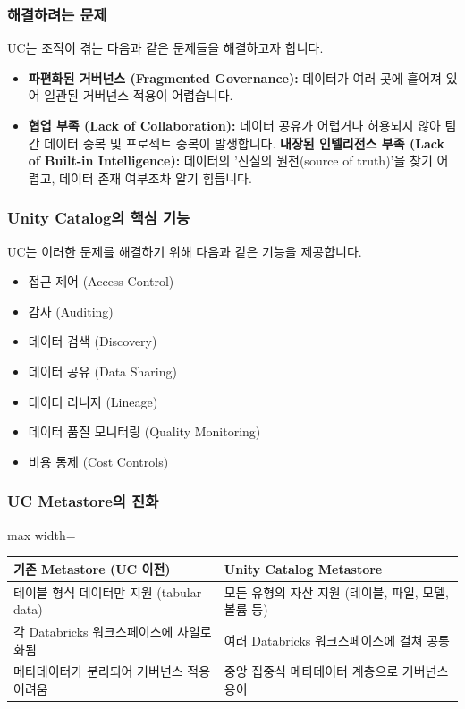 \documentclass[11pt,a4paper]{article}
\theoremstyle{definition}
\begin{document}
\subsubsection*{해결하려는 문제}
UC는 조직이 겪는 다음과 같은 문제들을 해결하고자 합니다.
\begin{itemize}
    \item \textbf{파편화된 거버넌스 (Fragmented Governance):} 데이터가 여러 곳에 흩어져 있어 일관된 거버넌스 적용이 어렵습니다.
    \item \textbf{협업 부족 (Lack of Collaboration):} 데이터 공유가 어렵거나 허용되지 않아 팀 간 데이터 중복 및 프로젝트 중복이 발생합니다.
    \textbf{내장된 인텔리전스 부족 (Lack of Built-in Intelligence):} 데이터의 '진실의 원천(source of truth)'을 찾기 어렵고, 데이터 존재 여부조차 알기 힘듭니다.
\end{itemize}

\subsubsection*{Unity Catalog의 핵심 기능}
UC는 이러한 문제를 해결하기 위해 다음과 같은 기능을 제공합니다.
\begin{itemize}
    \item 접근 제어 (Access Control)
    \item 감사 (Auditing)
    \item 데이터 검색 (Discovery)
    \item 데이터 공유 (Data Sharing)
    \item 데이터 리니지 (Lineage)
    \item 데이터 품질 모니터링 (Quality Monitoring)
    \item 비용 통제 (Cost Controls)
\end{itemize}

\subsubsection*{UC Metastore의 진화}
\begin{adjustbox}{max width=\textwidth}
\begin{tabular}{p{}p{}}
\toprule
\textbf{기존 Metastore (UC 이전)} & \textbf{Unity Catalog Metastore} \\
\midrule
테이블 형식 데이터만 지원 (tabular data) & 모든 유형의 자산 지원 (테이블, 파일, 모델, 볼륨 등) \\
각 Databricks 워크스페이스에 사일로화됨 & 여러 Databricks 워크스페이스에 걸쳐 공통 \\
메타데이터가 분리되어 거버넌스 적용 어려움 & 중앙 집중식 메타데이터 계층으로 거버넌스 용이 \\
\bottomrule
\end{tabular}
\end{adjustbox}
\label{tab:uc_metastore_comparison}
\end{document}
